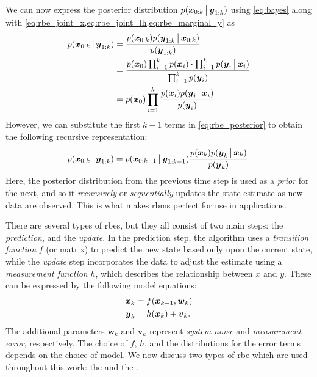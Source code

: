 We can now express the posterior distribution $p(\boldsymbol x_{0:k}\,\big|\,{}\boldsymbol{y}_{1:k})$ using \cref{eq:bayes} along with \cref{eq:rbe_joint_x,eq:rbe_joint_lh,eq:rbe_marginal_y} as
\begin{equation}
\label{eq:rbe_posterior}
\begin{split}
p(\boldsymbol x_{0:k}\,\big|\,{}\boldsymbol{y}_{1:k})
&= \frac{p(\boldsymbol x_{0:k})p(\boldsymbol{y}_{1:k}\,\big|\,{}\boldsymbol x_{0:k})}{p(\boldsymbol{y}_{1:k})} \\
&= \frac{
    p(\boldsymbol x_0)\prod_{i=1}^k p(\boldsymbol x_i) \cdot
    \prod_{i=1}^k p(\boldsymbol{y}_i\,\big|\,{}\boldsymbol x_i)
}{
    \prod_{i=1}^k p(\boldsymbol{y}_i)
} \\
&= p(\boldsymbol x_0)\prod_{i=1}^k
\frac{
    p(\boldsymbol x_i) p(\boldsymbol{y}_i\,\big|\,{}\boldsymbol x_i)
}{
    p(\boldsymbol{y}_i)
}
\end{split}
\end{equation}
However, we can substitute the first $k-1$ terms in \cref{eq:rbe_posterior} to obtain the following recursive representation:
\begin{equation}
\label{eq:rbe_posterior_recursive}
p(\boldsymbol x_{0:{k}}\,\big|\,{}\boldsymbol{y}_{1:k})
= p(\boldsymbol x_{0:k-1}\,\big|\,{}\boldsymbol{y}_{1:k-1})
\frac{
    p(\boldsymbol x_{k}) p(\boldsymbol{y}_{k}\,\big|\,{}\boldsymbol x_{k})
}{
    p(\boldsymbol{y}_{k})
}.
\end{equation}
Here, the posterior distribution from the previous time step is used as a \emph{prior} for the next, and so it \emph{recursively} or \emph{sequentially} updates the state estimate as new data are observed. This is what makes \glspl{rbm} perfect for use in \rt{} applications.


There are several types of \glspl{rbe}, but they all consist of two main steps: the \emph{prediction}, and the \emph{update}. In the prediction step, the algorithm uses a \emph{transition function} $f$ (or matrix) to predict the new state based only upon the current state, while the \emph{update} step incorporates the data to adjust the estimate using a \emph{measurement function} $h$, which describes the relationship between $x$ and $y$. These can be expressed by the following model equations:
\begin{equation}
\label{eq:rbe_model}
\begin{split}
\boldsymbol x_k &= f(\boldsymbol x_{k-1}, \boldsymbol{w}_k) \\
\boldsymbol{y}_k &= h(\boldsymbol x_k) + \boldsymbol{v}_k.
\end{split}
\end{equation}
The additional parameters $\boldsymbol{w}_k$ and $\boldsymbol{v}_k$ represent \emph{system noise} and \emph{measurement error}, respectively. The choice of $f$, $h$, and the distributions for the error terms depends on the choice of model. We now discuss two types of \gls{rbe} which are used throughout this work: the \kf{} and the \pf{}.


